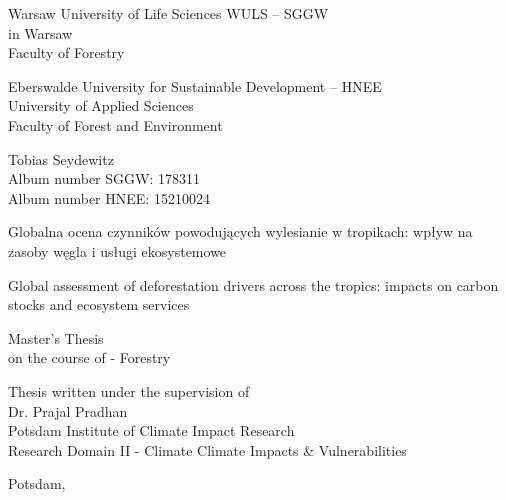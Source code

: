 \begin{titlepage}
	\begin{singlespace}
		\begin{center}
			\Large{Warsaw University of Life Sciences WULS – SGGW}\\
			\Large{in Warsaw}\\
			\Large{Faculty of Forestry}

			\smallskip

			\Large{Eberswalde University for Sustainable Development – HNEE}\\
			\Large{University of Applied Sciences}\\
			\Large{Faculty of Forest and Environment}

			\bigskip

			\large{Tobias Seydewitz}\\
			\normalsize{Album number SGGW: 178311}\\
			\normalsize{Album number HNEE: 15210024}

			\vspace{2cm}
 
			 \huge{Globalna ocena czynników powodujących wylesianie w tropikach: wpływ na zasoby węgla i usługi ekosystemowe}

			 \Large{Global assessment of deforestation drivers across the tropics: impacts on carbon stocks and ecosystem services}

			\bigskip

			\large{Master's Thesis}\\
			\large{on the course of - Forestry}

			\vspace{2cm}

			\begin{flushright}
				\normalsize{Thesis written under the supervision of}\\
				\normalsize{Dr. Prajal Pradhan}\\
				\normalsize{Potsdam Institute of Climate Impact Research}\\
				\normalsize{Research Domain II - Climate Climate Impacts \& Vulnerabilities}
			\end{flushright}

			\bigskip

			\normalsize{Potsdam, \the\year}
		\end{center}
	\end{singlespace}
\end{titlepage}